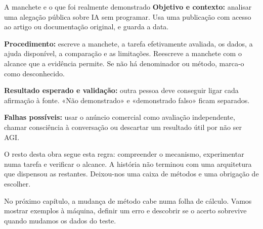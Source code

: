\begin{promptlabbox}{A manchete e o que foi realmente demonstrado}
\textbf{Objetivo e contexto:} analisar uma alegação pública sobre IA sem programar. Usa uma publicação com acesso ao artigo ou documentação original, e guarda a data.

\textbf{Procedimento:} escreve a manchete, a tarefa efetivamente avaliada, os dados, a ajuda disponível, a comparação e as limitações. Reescreve a manchete com o alcance que a evidência permite. Se não há denominador ou método, marca-o como desconhecido.

\textbf{Resultado esperado e validação:} outra pessoa deve conseguir ligar cada afirmação à fonte. «Não demonstrado» e «demonstrado falso» ficam separados.

\textbf{Falhas possíveis:} usar o anúncio comercial como avaliação independente, chamar consciência à conversação ou descartar um resultado útil por não ser AGI.
\end{promptlabbox}

O resto desta obra segue esta regra: compreender o mecanismo, experimentar numa tarefa e verificar o alcance. A história não terminou com uma arquitetura que dispensou as restantes. Deixou-nos uma caixa de métodos e uma obrigação de escolher.

No próximo capítulo, a mudança de método cabe numa folha de cálculo. Vamos mostrar exemplos à máquina, definir um erro e descobrir se o acerto sobrevive quando mudamos os dados do teste.
